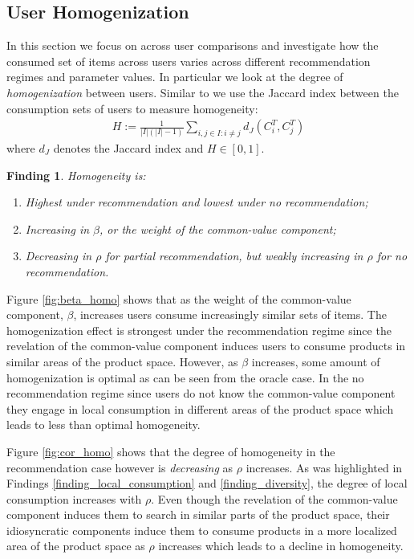 \documentclass[sigconf]{acmart}
\newtheorem{finding}{Finding}
\begin{document}
\subsection{User Homogenization}
In this section we focus on across user comparisons and investigate how the consumed set of items across users varies across different recommendation regimes and parameter values. In particular we look at the degree of \textit{homogenization} between users. Similar to \cite{chaney2018algorithmic} we use the Jaccard index between the consumption sets of users to measure homogeneity:
\begin{align*}
H:=\frac{1}{|I|(|I|-1)}\sum_{i,j \in I: i \ne j}d_J(C_i^T,C_j^T)
\end{align*}
where $d_J$ denotes the Jaccard index and $H \in [0,1]$.
\begin{finding}\label{finding_homogeneity}
Homogeneity is:
\begin{enumerate}
\item Highest under recommendation and lowest under no recommendation;
\item Increasing in $\beta$, or the weight of the common-value component;
\item Decreasing in $\rho$ for partial recommendation, but weakly increasing in $\rho$ for no recommendation.
\end{enumerate}
\end{finding}
Figure \ref{fig:beta_homo} shows that as the weight of the common-value component, $\beta$, increases users consume increasingly similar sets of items. The homogenization effect is strongest under the recommendation regime since the revelation of the common-value component induces users to consume products in similar areas of the product space. However, as $\beta$ increases, some amount of homogenization is optimal as can be seen from the oracle case. In the no recommendation regime since users do not know the common-value component they engage in local consumption in different areas of the product space which leads to less than optimal homogeneity.
\par

Figure \ref{fig:cor_homo} shows that the degree of homogeneity in the recommendation case however is \textit{decreasing} as $\rho$ increases. As was highlighted in Findings \ref{finding_local_consumption} and \ref{finding_diversity}, the degree of local consumption increases with $\rho$. Even though the revelation of the common-value component induces them to search in similar parts of the product space, their idiosyncratic components induce them to consume products in a more localized area of the product space as $\rho$ increases which leads to a decline in homogeneity.
\end{document}
